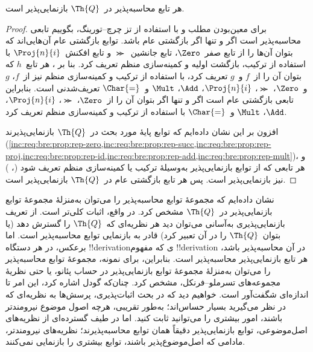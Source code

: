 \documentclass[../../../include/open-logic-section]{subfiles}
\begin{document}

\begin{thm}
هر تابع محاسبه‌پذیر در~$\Th{Q}$ بازنمایی‌پذیر است.
\end{thm}

\begin{proof}
برای معین‌بودن مطلب و با استفاده از تز چرچ--تورینگ، بگوییم تابعی
محاسبه‌پذیر است اگر و تنها اگر بازگشتی عام باشد. توابع بازگشتی عام
آن‌هایی‌اند که بتوان آن‌ها را از تابع صفر~$\Zero$، تابع
جانشین~$\Succ$ و تابع افکنش~$\Proj{n}{i}$ با استفاده از ترکیب، بازگشت
اولیه و کمینه‌سازی منظم تعریف کرد. بنا بر ،
هر تابع~$h$ که بتوان آن را از~$f$ و~$g$ تعریف کرد، با استفاده از ترکیب
و کمینه‌سازی منظم نیز از~$f$، $g$ و~$\Zero$، $\Succ$، $\Proj{n}{i}$،
$\Add$، $\Mult$ و~$\Char{=}$ تعریف‌شدنی است. بنابراین تابعی بازگشتی
عام است اگر و تنها اگر بتوان آن را از~$\Zero$، $\Succ$،
$\Proj{n}{i}$، $\Add$، $\Mult$ و~$\Char{=}$ با استفاده از ترکیب و
کمینه‌سازی منظم تعریف کرد.

افزون بر این نشان داده‌ایم که توابع پایهٔ مورد بحث در~$\Th{Q}$
بازنمایی‌پذیرند
(\cref{inc:req:bre:prop:rep-zero,inc:req:bre:prop:rep-succ,inc:req:bre:prop:rep-proj,inc:req:bre:prop:rep-id,inc:req:bre:prop:rep-add,inc:req:bre:prop:rep-mult})،
و هر تابعی که از توابع بازنمایی‌پذیر به‌وسیلهٔ ترکیب یا کمینه‌سازی
منظم تعریف شود
(،
) نیز بازنمایی‌پذیر است. پس هر تابع
بازگشتی عام در~$\Th{Q}$ بازنمایی‌پذیر است.
\end{proof}

\begin{explain}
نشان داده‌ایم که مجموعهٔ توابع محاسبه‌پذیر را می‌توان به‌منزلهٔ مجموعهٔ
توابع بازنمایی‌پذیر در~$\Th{Q}$ مشخص کرد. در واقع، اثبات کلی‌تر است.
از تعریف بازنمایی‌پذیری به‌آسانی می‌توان دید هر نظریه‌ای که~$\Th{Q}$
را گسترش دهد (یا بتوان~$\Th{Q}$ را در آن تعبیر کرد) قادر به بازنمایی
توابع محاسبه‌پذیر است. اما برعکس، در هر دستگاه !!{derivation}ی که مفهوم
!!{derivation} در آن محاسبه‌پذیر باشد، هر تابع بازنمایی‌پذیر محاسبه‌پذیر
است. بنابراین، برای نمونه، مجموعهٔ توابع محاسبه‌پذیر را می‌توان
به‌منزلهٔ مجموعهٔ توابع بازنمایی‌پذیر در حساب پئانو، یا حتی نظریهٔ
مجموعه‌های تسرملو--فرنکل، مشخص کرد. چنان‌که گودل اشاره کرد، این امر تا
اندازه‌ای شگفت‌آور است. خواهیم دید که در بحث اثبات‌پذیری، پرسش‌ها به
نظریه‌ای که در نظر می‌گیرید بسیار حساس‌اند؛ به‌طور تقریبی، هرچه اصول
موضوع نیرومندتر باشند، امور بیشتری را می‌توانید ثابت کنید. اما در
طیف گسترده‌ای از نظریه‌های اصل‌موضوعی، توابع بازنمایی‌پذیر دقیقاً همان
توابع محاسبه‌پذیرند؛ نظریه‌های نیرومندتر، مادامی که اصل‌موضوع‌پذیر
باشند، توابع بیشتری را بازنمایی نمی‌کنند.
\end{explain}
\end{document}
